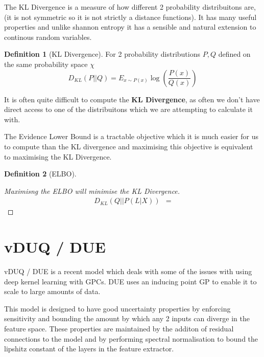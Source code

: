 \documentclass[12pt, a4paper]{report}
\theoremstyle{definition}
\newtheorem{definition}{Definition}[section]
\newtheorem{proof}{Proof}[section]
\begin{document}
The KL Divergence is a measure of how different 2 probability distribuitons are, (it is not symmetric so it is not strictly a distance functions). It has many useful properties and unlike shannon entropy it has a sensible and natural extension to continous random variables.

\begin{definition}[KL Divergence]
    For 2 probability distributions $P, Q$ defined on the same probability space $\chi$
    $$D_{KL} \left( P || Q \right) = E_{x \sim P(x)}  \log \left( \frac{P(x)}{Q(x)}\right)$$
\end{definition}



It is often quite difficult to compute the \textbf{KL Divergence}, as often we don't have direct access to one of the distribuitons which we are attempting to calculate it with.

The Evidence Lower Bound is a tractable objective which it is much easier for us to compute than the KL divergence and maximising this objective is equivalent to maximising the KL Divergence.

\begin{definition}[ELBO]
    
\end{definition}


\begin{proof}[Maximisng the ELBO will minimise the KL Divergence]
    \begin{align*}
        D_{KL} \left( Q || P \left(L | X\right) \right) &= 
    \end{align*}
\end{proof}


\chapter{vDUQ / DUE}

vDUQ / DUE \cite{vanamersfoort2020uncertainty} is a recent model which deals with some of the issues with using deep kernel learning with GPCs. DUE uses an inducing point GP to enable it to scale to large amounts of data.

This model is designed to have good uncertainty properties by enforcing sensitivity and bounding the amount by which any 2 inputs can diverge in the feature space. These properties are maintained by the additon of residual connections to the model and by performing spectral normalisation to bound the lipshitz constant of the layers in the feature extractor.
\end{document}
